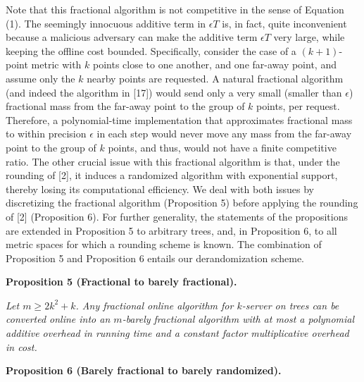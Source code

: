 Note that this fractional algorithm is not competitive in the sense of Equation (1). The seemingly innocuous additive term in $\epsilon T$ is, in fact, quite inconvenient because a malicious adversary can make the additive term $\epsilon T$ very large, while keeping the offline cost bounded. Specifically, consider the case of a $(k+1)$-point metric with $k$ points close to one another, and one far-away point, and assume only the $k$ nearby points are requested. A natural fractional algorithm (and indeed the algorithm in [17]) would send only a very small (smaller than $\epsilon$) fractional mass from the far-away point to the group of $k$ points, per request. Therefore, a polynomial-time implementation that approximates fractional mass to within precision $\epsilon$ in each step would never move any mass from the far-away point to the group of $k$ points, and thus, would not have a finite competitive ratio. The other crucial issue with this fractional algorithm is that, under the rounding of [2], it induces a randomized algorithm with exponential support, thereby losing its computational efficiency. We deal with both issues by discretizing the fractional algorithm (Proposition 5) before applying the rounding of [2] (Proposition 6). For further generality, the statements of the propositions are extended in Proposition 5 to arbitrary trees, and, in Proposition 6, to all metric spaces for which a rounding scheme is known. The combination of Proposition 5 and Proposition 6 entails our derandomization scheme.\par





\par\medskip\noindent\textbf{
\textbf{Proposition 5}\textbf{ }(Fractional to barely fractional)\textbf{.}
}\par



\emph{Let $m\geq 2k^{2}+k$. Any fractional online algorithm for $k$-server on trees can be converted online into an $m$-barely fractional algorithm with at most a polynomial additive overhead in running time and a constant factor multiplicative overhead in cost.}\par







\par\medskip\noindent\textbf{
\textbf{Proposition 6}\textbf{ }(Barely fractional to barely randomized)\textbf{.}
}\par



